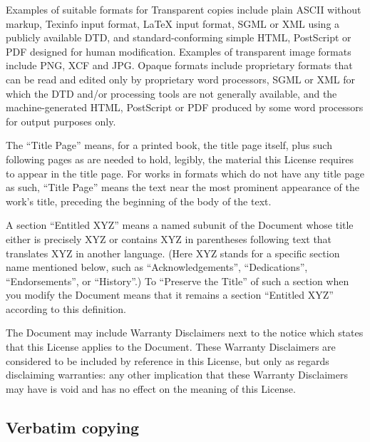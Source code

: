 {\tiny{}Examples of suitable formats for Transparent copies include
plain ASCII without markup, Texinfo input format, \LaTeX{} input format,
SGML or XML using a publicly available DTD, and standard-conforming
simple HTML, PostScript or PDF designed for human modification. Examples
of transparent image formats include PNG, XCF and JPG. Opaque formats
include proprietary formats that can be read and edited only by proprietary
word processors, SGML or XML for which the DTD and/or processing tools
are not generally available, and the machine-generated HTML, PostScript
or PDF produced by some word processors for output purposes only.}{\tiny\par}

{\tiny{}The \textsf{``}Title Page\textsf{''} means, for a printed book, the title
page itself, plus such following pages as are needed to hold, legibly,
the material this License requires to appear in the title page. For
works in formats which do not have any title page as such, \textquotedblleft Title
Page\textquotedblright{} means the text near the most prominent appearance
of the work's title, preceding the beginning of the body of the text.}{\tiny\par}

{\tiny{}A section \textsf{``}Entitled XYZ\textsf{''} means a named subunit of the
Document whose title either is precisely XYZ or contains XYZ in parentheses
following text that translates XYZ in another language. (Here XYZ
stands for a specific section name mentioned below, such as \textquotedblleft Acknowledgements\textquotedblright ,
\textquotedblleft Dedications\textquotedblright , \textquotedblleft Endorsements\textquotedblright ,
or \textquotedblleft History\textquotedblright .) To \textquotedblleft Preserve
the Title\textquotedblright{} of such a section when you modify the
Document means that it remains a section \textquotedblleft Entitled
XYZ\textquotedblright{} according to this definition.}{\tiny\par}

{\tiny{}The Document may include Warranty Disclaimers next to the
notice which states that this License applies to the Document. These
Warranty Disclaimers are considered to be included by reference in
this License, but only as regards disclaiming warranties: any other
implication that these Warranty Disclaimers may have is void and has
no effect on the meaning of this License.}{\tiny\par}

\subsection{Verbatim copying\label{subsec:2Verbatim-copying}}

